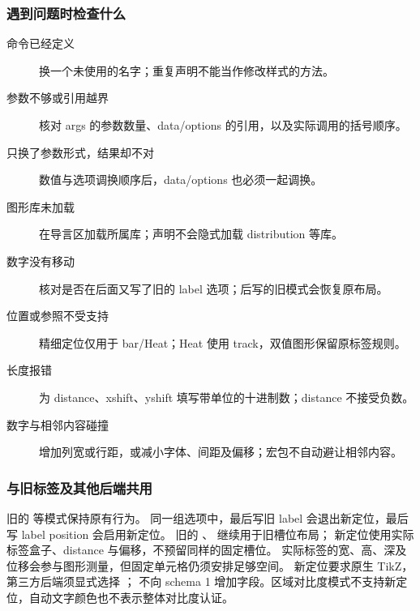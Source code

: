 \subsubsection{遇到问题时检查什么}
\begin{description}
\item[命令已经定义] 换一个未使用的名字；重复声明不能当作修改样式的方法。
\item[参数不够或引用越界] 核对 args 的参数数量、data/options 的引用，以及实际调用的括号顺序。
\item[只换了参数形式，结果却不对] 数值与选项调换顺序后，data/options 也必须一起调换。
\item[图形库未加载] 在导言区加载所属库；声明不会隐式加载 distribution 等库。
\item[数字没有移动] 核对是否在后面又写了旧的 label 选项；后写的旧模式会恢复原布局。
\item[位置或参照不受支持] 精细定位仅用于 bar/Heat；Heat 使用 track，双值图形保留原标签规则。
\item[长度报错] 为 distance、xshift、yshift 填写带单位的十进制数；distance 不接受负数。
\item[数字与相邻内容碰撞] 增加列宽或行距，或减小字体、间距及偏移；宏包不自动避让相邻内容。
\end{description}

\subsubsection{与旧标签及其他后端共用}
旧的  等模式保持原有行为。
同一组选项中，最后写旧 label 会退出新定位，最后写 label position 会启用新定位。
旧的 、 继续用于旧槽位布局；
新定位使用实际标签盒子、distance 与偏移，不预留同样的固定槽位。
实际标签的宽、高、深及位移会参与图形测量，但固定单元格仍须安排足够空间。
新定位要求原生 TikZ，第三方后端须显式选择 ；
不向 schema 1 增加字段。区域对比度模式不支持新定位，自动文字颜色也不表示整体对比度认证。
